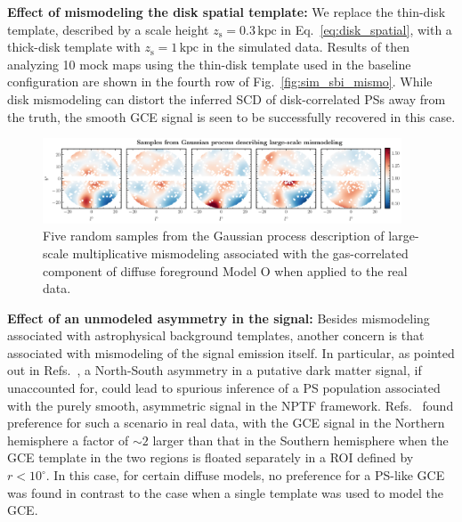 \documentclass[prd,aps,10pt,nofootinbib,twocolumn,superscriptaddress,preprintnumbers,balancelastpage,longbibliography]{revtex4-1}
\begin{document}
\noindent
\textbf{Effect of mismodeling the disk spatial template:} 
We replace the thin-disk template, described by a scale height $z_\mathrm{s} = 0.3\,\mathrm{kpc}$ in Eq.~\eqref{eq:disk_spatial}, with a thick-disk template with $z_\mathrm{s} = 1\,\mathrm{kpc}$ in the simulated data. Results of then analyzing 10 mock maps using the thin-disk template used in the baseline configuration are shown in the fourth row of Fig.~\ref{fig:sim_sbi_mismo}. While disk mismodeling can distort the inferred SCD of disk-correlated PSs away from the truth, the smooth GCE signal is seen to be successfully recovered in this case. \\

%
\begin{figure}
\centering
\includegraphics[width=0.95\textwidth]{plots/dd_mismo_map.pdf}
\caption{Five random samples from the Gaussian process description of large-scale multiplicative mismodeling associated with the gas-correlated component of diffuse foreground Model O when applied to the real \Fermi data.}
\label{fig:dd_mismo_map}
\end{figure}
%

\noindent
\textbf{Effect of an unmodeled asymmetry in the signal:}
Besides mismodeling associated with astrophysical background templates, another concern is that associated with mismodeling of the signal emission itself. In particular, as pointed out in Refs.~\cite{Leane:2020nmi,Leane:2020pfc}, a North-South asymmetry in a putative dark matter signal, if unaccounted for, could lead to spurious inference of a PS population associated with the purely smooth, asymmetric signal in the NPTF framework. Refs.~\cite{Leane:2020nmi,Leane:2020pfc} found preference for such a scenario in real \Fermi data, with the GCE signal in the Northern hemisphere a factor of $\sim2$ larger than that in the Southern hemisphere when the GCE template in the two regions is floated separately in a ROI defined by $r < 10^\circ$. In this case, for certain diffuse models, no preference for a PS-like GCE was found in contrast to the case when a single template was used to model the GCE. 
\end{document}
